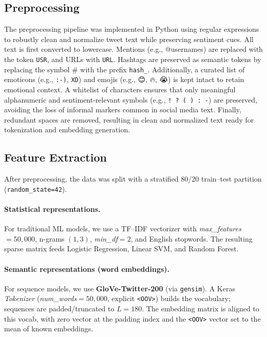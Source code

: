 \documentclass[10pt]{article}
\begin{document}
\subsection{Preprocessing}
The preprocessing pipeline was implemented in Python using regular expressions to robustly clean and normalize tweet text while preserving sentiment cues.
All text is first converted to lowercase. Mentions (e.g., @usernames) are replaced with the token \texttt{USR}, and URLs with \texttt{URL}.
Hashtags are preserved as semantic tokens by replacing the symbol \# with the prefix \texttt{hash\_}.
Additionally, a curated list of emoticons (e.g., \texttt{:-)}, \texttt{XD}) and emojis (e.g., 😊, 🔥, 😭) is kept intact to retain emotional context.
A whitelist of characters ensures that only meaningful alphanumeric and sentiment-relevant symbols (e.g., \texttt{! ? ( ) : -}) are preserved, avoiding the loss of informal markers common in social media text.
Finally, redundant spaces are removed, resulting in clean and normalized text ready for tokenization and embedding generation.

\subsection{Feature Extraction}
After preprocessing, the data was split with a stratified 80/20 train--test partition (\texttt{random\_state=42}).

\paragraph{Statistical representations.}
For traditional ML models, we use a TF--IDF vectorizer with \textit{max\_features} $=50{,}000$, n-grams $(1,3)$, \textit{min\_df}$=2$, and English stopwords. The resulting sparse matrix feeds Logistic Regression, Linear SVM, and Random Forest.

\paragraph{Semantic representations (word embeddings).}
For sequence models, we use \textbf{GloVe-Twitter-200} (via \texttt{gensim}). A Keras \textit{Tokenizer} (\textit{num\_words}$=50{,}000$, explicit \texttt{<OOV>}) builds the vocabulary; sequences are padded/truncated to $L=180$. The embedding matrix is aligned to this vocab, with zero vector at the padding index and the \texttt{<OOV>} vector set to the mean of known embeddings.
\end{document}
